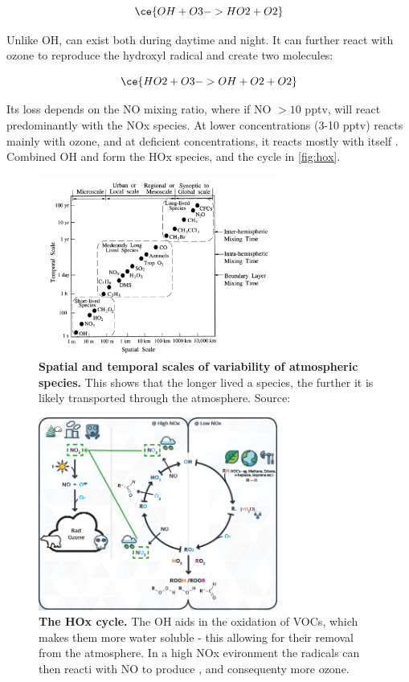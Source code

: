 \begin{equation}
  \ce{OH + O3 -> HO2 + O2}
\end{equation}

Unlike OH,  can exist both during daytime and night. It can further react with ozone to reproduce the hydroxyl radical and create two  molecules:

\begin{equation}
  \ce{HO2 + O3 -> OH + O2 + O2}
\end{equation}

Its loss depends on the NO mixing ratio, where if NO $>10$ pptv,  will react predominantly with the NOx species. At lower concentrations (3-10 pptv)  reacts mainly with ozone, and at deficient concentrations, it reacts mostly with itself \citep{finlayson}. Combined OH and  form the HOx species, and the cycle in \autoref{fig:hox}.

\begin{figure}[H]
  \centering
  \includegraphics[width=0.7\textwidth]{timescales.png}
  \caption{\textbf{Spatial and temporal scales of variability of atmospheric species.} This shows that the longer lived a species, the further it is likely transported through the atmosphere. Source: \citep{transporttime}}
  \label{fig:timescales}
\end{figure}

\begin{figure}[H]
    \centering
    \includegraphics[width=0.7\textwidth]{hoxcycle.png}
    \caption{\textbf{The HOx cycle.} The OH aids in the oxidation of VOCs, which makes them more water soluble - this allowing for their removal from the atmosphere. In a high NOx evironment the  radicals can then reacti with NO to produce , and consequenty more ozone.}
    \label{fig:hox}
\end{figure}


